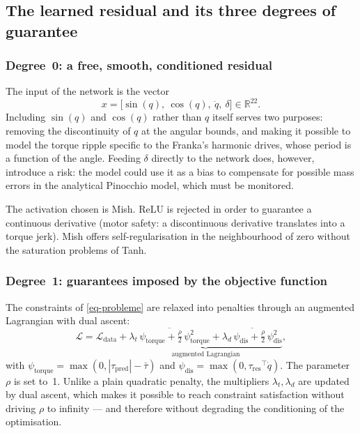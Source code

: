\documentclass[a4paper, oneside]{article}
\newcommand{\q}{\ensuremath{q}}
\newcommand{\qd}{\ensuremath{\dot{q}}}
\newcommand{\taures}{\ensuremath{\tau_{\mathrm{res}}}}
\newcommand{\taupred}{\ensuremath{\tau_{\mathrm{pred}}}}
\newcommand{\Rset}{\ensuremath{\mathbb{R}}}
\begin{document}
\subsection{The learned residual and its three degrees of guarantee}
\label{sec-residu}

\subsubsection{Degree~0: a free, smooth, conditioned residual}
\label{sec-degre0}

The input of the network is the vector
%
\begin{equation}
    x = \bigl[\sin(\q),\ \cos(\q),\ \qd,\ \delta\bigr] \in \Rset^{22}.
    \label{eq-encodage}
\end{equation}
%
Including $\sin(\q)$ and $\cos(\q)$ rather than $\q$ itself serves two purposes:
removing the discontinuity of $\q$ at the angular bounds, and making it
possible to model the torque ripple specific to the Franka's harmonic drives,
whose period is a function of the angle. Feeding $\delta$ directly to the
network does, however, introduce a risk: the model could use it as a bias to
compensate for possible mass errors in the analytical Pinocchio model, which
must be monitored.

The activation chosen is Mish. ReLU is rejected in order to guarantee a
continuous derivative (motor safety: a discontinuous derivative translates into
a torque jerk). Mish offers self-regularisation in the neighbourhood of zero
without the saturation problems of Tanh.

\subsubsection{Degree~1: guarantees imposed by the objective function}
\label{sec-degre1}

The constraints of \cref{eq-probleme} are relaxed into penalties through an
augmented Lagrangian with dual ascent:
%
\begin{equation}
    \mathcal{L}
    = \mathcal{L}_{\mathrm{data}}
    + \underbrace{\overline{\lambda_{t}\,\psi_{\mathrm{torque}}
      + \tfrac{\rho}{2}\,\psi_{\mathrm{torque}}^{2}}
    + \overline{\lambda_{d}\,\psi_{\mathrm{dis}}
      + \tfrac{\rho}{2}\,\psi_{\mathrm{dis}}^{2}}}
      _{\text{augmented Lagrangian}} ,
    \label{eq-Ltotal}
\end{equation}
%
with $\psi_{\mathrm{torque}} = \max(0, |\taupred| - \bar{\tau})$ and
$\psi_{\mathrm{dis}} = \max(0, \taures^{\top}\qd)$. The parameter $\rho$ is set
to~1. Unlike a plain quadratic penalty, the multipliers $\lambda_{t},
\lambda_{d}$ are updated by dual ascent, which makes it possible to reach
constraint satisfaction without driving $\rho$ to infinity --- and therefore
without degrading the conditioning of the optimisation.
\end{document}
